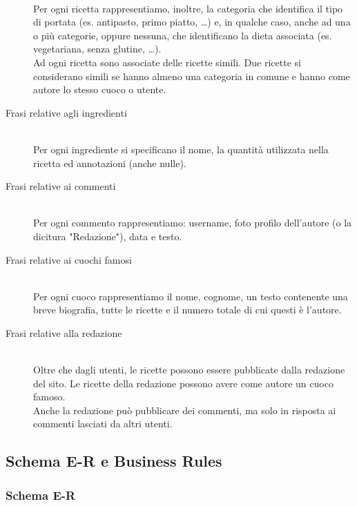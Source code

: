 \documentclass[12pt]{extarticle}
\begin{document}
\begin{description}
    \\ Per ogni ricetta rappresentiamo, inoltre, la categoria che identifica il tipo di portata (es. antipasto, primo piatto, \dots) e, in qualche caso, anche ad una o più categorie, oppure nessuna, che identificano la dieta associata (es. vegetariana, senza glutine, \dots).
    \\ Ad ogni ricetta sono associate delle ricette simili. Due ricette si considerano simili se hanno almeno una categoria in comune e hanno come autore lo stesso cuoco o utente.
    \item[Frasi relative agli ingredienti] \hfill
    \\ Per ogni ingrediente si specificano il nome, la quantità utilizzata nella ricetta ed annotazioni (anche nulle).
    \item[Frasi relative ai commenti] \hfill
    \\ Per ogni commento rappresentiamo: username, foto profilo dell'autore (o la dicitura "Redazione"), data e testo.
    \item[Frasi relative ai cuochi famosi] \hfill
    \\ Per ogni cuoco rappresentiamo il nome, cognome, un testo contenente una breve biografia, tutte le ricette e il numero totale di cui questi è l'autore.
    \item[Frasi relative alla redazione] \hfill  
    \\ Oltre che dagli utenti, le ricette possono essere pubblicate dalla redazione del sito. Le ricette della redazione possono avere come autore un cuoco famoso.
    \\ Anche la redazione può pubblicare dei commenti, ma solo in risposta ai commenti lasciati da altri utenti.    
\end{description}


\subsection{Schema E-R e Business Rules}
\subsubsection{Schema E-R}
\end{document}

